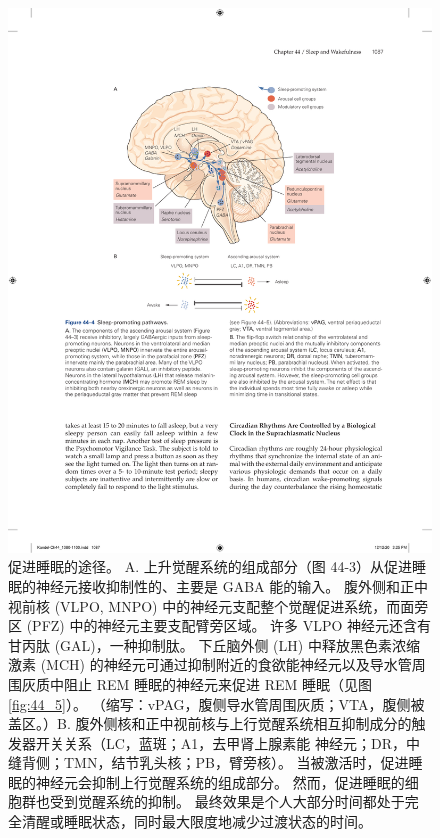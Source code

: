 \begin{figure}[htbp]
	\centering
	\includegraphics[width=0.7\linewidth]{chap44/fig_44_4}
	\caption{促进睡眠的途径。 A. 上升觉醒系统的组成部分（图 44-3）从促进睡眠的神经元接收抑制性的、主要是 GABA 能的输入。 腹外侧和正中视前核 (VLPO, MNPO) 中的神经元支配整个觉醒促进系统，而面旁区 (PFZ) 中的神经元主要支配臂旁区域。 许多 VLPO 神经元还含有甘丙肽 (GAL)，一种抑制肽。 下丘脑外侧 (LH) 中释放黑色素浓缩激素 (MCH) 的神经元可通过抑制附近的食欲能神经元以及导水管周围灰质中阻止 REM 睡眠的神经元来促进 REM 睡眠（见图 \ref{fig:44_5}）。 （缩写：vPAG，腹侧导水管周围灰质；VTA，腹侧被盖区。）B. 腹外侧核和正中视前核与上行觉醒系统相互抑制成分的触发器开关关系（LC，蓝斑；A1，去甲肾上腺素能 神经元；DR，中缝背侧；TMN，结节乳头核；PB，臂旁核）。 当被激活时，促进睡眠的神经元会抑制上行觉醒系统的组成部分。 然而，促进睡眠的细胞群也受到觉醒系统的抑制。 最终效果是个人大部分时间都处于完全清醒或睡眠状态，同时最大限度地减少过渡状态的时间。}
	\label{fig:44_4}
\end{figure}


